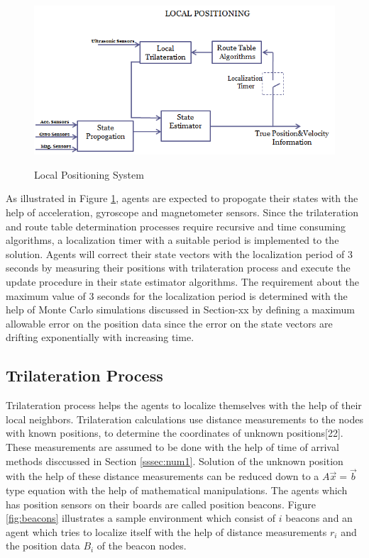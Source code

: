 \begin{figure}[H]
\caption{Local Positioning System}
\centering
\includegraphics[scale = 0.65]{lps}
\label{fig:lps}
\end{figure}

As illustrated in Figure \ref{fig:lps}, agents are expected to propogate their states with the help of acceleration, gyroscope and magnetometer sensors. Since the trilateration and route table determination processes require recursive and time consuming algorithms, a localization timer with a suitable period is implemented to the solution. Agents will correct their state vectors with the localization period of 3 seconds by measuring their positions with trilateration process and execute the update procedure in their state estimator algorithms. The requirement about the maximum value of 3 seconds for the localization period is determined with the help of Monte Carlo simulations discussed in Section-xx by defining a maximum allowable error on the position data since the error on the state vectors are drifting exponentially with increasing time.   

\subsection{Trilateration Process}
Trilateration process helps the agents to localize themselves with the help of their local neighbors.  Trilateration calculations use distance measurements to the nodes with known positions, to determine the coordinates of unknown positions[22]. These measurements are assumed to be done with the help of time of arrival methods disccussed in Section \ref{sssec:num1}.  Solution of the unknown position with the help of these distance measurements can be reduced down to a $A\vec{x} = \vec{b}$ type equation with the help of mathematical manipulations. The agents which has position sensors on their boards are called position beacons. Figure \ref{fig:beacons} illustrates a sample environment which consist of $i$ beacons and an agent which tries to localize itself with the help of distance measurements $r_i$ and the position data $B_i$ of the beacon nodes.

